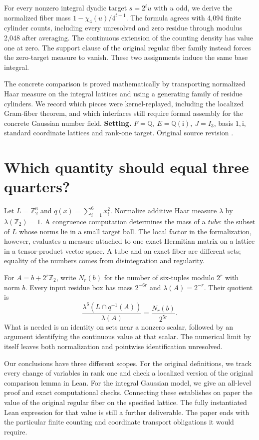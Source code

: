 \documentclass[12pt,letterpaper]{article}
\newcommand{\code}[1]{\texttt{\detokenize{#1}}}
\begin{document}
For every nonzero integral dyadic target \(s=2^t u\) with \(u\) odd, we derive the normalized fiber mass \(1-\chi_4(u)/4^{t+1}\). The formula agrees with 4,094 finite cylinder counts, including every unresolved and zero residue through modulus 2,048 after averaging. The continuous extension of the counting density has value one at zero. The support clause of the original regular fiber family instead forces the zero-target measure to vanish. These two assignments induce the same base integral.

The concrete comparison is proved mathematically by transporting normalized Haar measure on the integral lattices and using a generating family of residue cylinders. We record which pieces were kernel-replayed, including the localized Gram-fiber theorem, and which interfaces still require formal assembly for the concrete Gaussian number field.
\vfill\textbf{Setting.} \(F=\mathbb Q,\ E=\mathbb Q(\mathrm i),\ J=I_3\), basis \(1,\mathrm i\), standard coordinate lattices and rank-one target. Original source revision \code{40e56bab}.
\clearpage{\small\setlength{\parskip}{0pt}\tableofcontents}\clearpage{}

\section{Which quantity should equal three quarters?}
Let \(L=\mathbb Z_2^6\) and \(q(x)=\sum_{i=1}^6x_i^2\). Normalize additive Haar measure \(\lambda\) by \(\lambda(\mathbb Z_2)=1\). A congruence computation determines the mass of a \emph{tube}: the subset of \(L\) whose norms lie in a small target ball. The local factor in the formalization, however, evaluates a measure attached to one exact Hermitian matrix on a lattice in a tensor-product vector space. A tube and an exact fiber are different sets; equality of the numbers comes from disintegration and regularity.

For \(A=b+2^r\mathbb Z_2\), write \(N_r(b)\) for the number of six-tuples modulo \(2^r\) with norm \(b\). Every input residue box has mass \(2^{-6r}\) and \(\lambda(A)=2^{-r}\). Their quotient is
\[
 \frac{\lambda^6(L\cap q^{-1}(A))}{\lambda(A)}
                =\frac{N_r(b)}{2^{5r}}.
\]
What is needed is an identity on sets near a nonzero scalar, followed by an argument identifying the continuous value at that scalar. The numerical limit by itself leaves both normalization and pointwise identification unresolved.

Our conclusions have three different scopes. For the original definitions, we track every change of variables in rank one and check a localized version of the original comparison lemma in Lean. For the integral Gaussian model, we give an all-level proof and exact computational checks. Connecting these establishes on paper the value of the original regular fiber on the specified lattice. The fully instantiated Lean expression for that value is still a further deliverable. The paper ends with the particular finite counting and coordinate transport obligations it would require.
\end{document}
